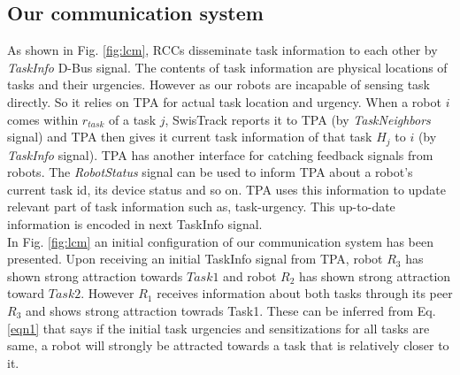 \documentclass[letterpaper, 10 pt, conference]{ieeeconf}  %
\begin{document}
\subsection{Our communication system}
As shown in Fig. \ref{fig:lcm}, RCCs  disseminate task information to each other by  \textit{TaskInfo} D-Bus signal. The contents of task information are physical locations of tasks and their urgencies. However as our robots are incapable of sensing task directly. So it relies on TPA for actual task location and urgency. When a robot $i$ comes within $r_{task}$ of a task $j$, SwisTrack reports it to TPA (by {\em TaskNeighbors} signal) and TPA then gives it current task information of that task $H_j$ to $i$ (by {\em TaskInfo} signal).
TPA has another interface for catching feedback signals from robots. The \textit{RobotStatus} signal can be used to inform TPA about a robot's current task id, its device status and so on. TPA uses this information to update relevant part of task information such as, task-urgency. This up-to-date information is encoded in next TaskInfo signal.\\
In Fig. \ref{fig:lcm} an initial configuration of our communication system has been presented. Upon receiving an initial TaskInfo signal from TPA, robot $R_3$ has shown strong attraction towards $Task1$ and robot $R_2$ has shown strong attraction toward $Task2$. However $R_1$ receives information about both tasks through its peer $R_3$ and shows strong attraction towrads Task1. These can be inferred from Eq. \ref{eqn1} that says if the initial task urgencies and sensitizations for all tasks are same, a robot will strongly be attracted towards a task that is relatively closer to it.
\end{document}
